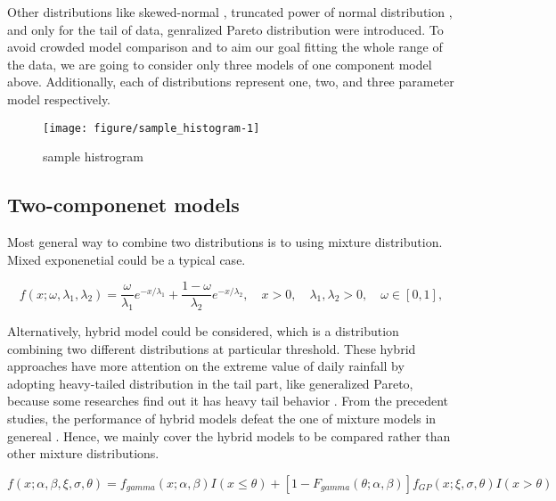 \documentclass[12pt]{article}\usepackage[]{graphicx}\usepackage[]{color}
\makeatletter
\def\maxwidth{ %
  \ifdim\Gin@nat@width>\linewidth
    \linewidth
  \else
    \Gin@nat@width
  \fi
}
\makeatother
\begin{document}
Other distributions like skewed-normal \cite{wan2005stochastic}, truncated power of normal distribution \cite{bardossy1992space}, and only for the tail of data, genralized Pareto distribution \cite{} were introduced. To avoid crowded model comparison and to aim our goal fitting the whole range of the data, we are going to consider only three models of one component model above. Additionally, each of distributions represent one, two, and three parameter model respectively.

\begin{figure}
\texttt{[image: figure/sample\_histogram-1]} \caption[sample histrogram]{sample histrogram}\label{fig:sample histogram}
\end{figure}




	\subsection{Two-componenet models} 


Most general way to combine two distributions is to using mixture distribution. Mixed exponenetial could be a typical case. 

\begin{equation}
  \label{mixed_exp.pdf}
  f(x ; \omega, \lambda_1, \lambda_2) = \frac {\omega} {\lambda_1} e^{-x/\lambda_1} + \frac {1-\omega} {\lambda_2} e^{-x/\lambda_2}, \quad x > 0, \quad \lambda_1, \lambda_2 > 0, \quad \omega \in [0,1], 
\end{equation}

Alternatively, hybrid model could be considered, which is a distribution combining two different distributions at particular threshold. These hybrid approaches have more attention on the extreme value of daily rainfall by adopting heavy-tailed distribution in the tail part, like generalized Pareto, because some researches find out it has heavy tail behavior \cite{koutsoyiannis2004statistics}. From the precedent studies, the performance of hybrid models defeat the one of mixture models in genereal \cite{li2012simulation, furrer2008improving}. Hence, we mainly cover the hybrid models to be compared rather than other mixture distributions. 

\begin{equation}
  \label{gamma_gp_hybrid.pdf}
  f(x ; \alpha, \beta, \xi, \sigma, \theta) = f_{gamma}(x ; \alpha, \beta) I(x \leq \theta) + [1-F_{gamma}(\theta ; \alpha, \beta)] f_{GP}(x ; \xi, \sigma, \theta) I(x > \theta)
\end{equation}
\end{document}
